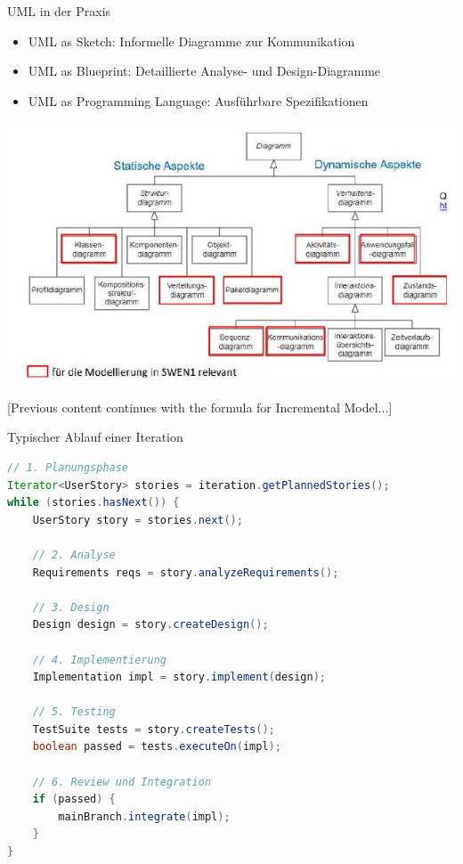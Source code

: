 \begin{concept}{UML in der Praxis}
\begin{itemize}
    \item UML as Sketch: Informelle Diagramme zur Kommunikation
    \item UML as Blueprint: Detaillierte Analyse- und Design-Diagramme
    \item UML as Programming Language: Ausführbare Spezifikationen
\end{itemize}
\includegraphics[width=\linewidth]{images/2024_12_29_0d1d7b5551ea1b4b41bdg-01(1)}
\end{concept}

[Previous content continues with the formula for Incremental Model...]

\begin{examplecode}{Typischer Ablauf einer Iteration}
\begin{lstlisting}[language=Java]
// 1. Planungsphase
Iterator<UserStory> stories = iteration.getPlannedStories();
while (stories.hasNext()) {
    UserStory story = stories.next();
    
    // 2. Analyse
    Requirements reqs = story.analyzeRequirements();
    
    // 3. Design
    Design design = story.createDesign();
    
    // 4. Implementierung
    Implementation impl = story.implement(design);
    
    // 5. Testing
    TestSuite tests = story.createTests();
    boolean passed = tests.executeOn(impl);
    
    // 6. Review und Integration
    if (passed) {
        mainBranch.integrate(impl);
    }
}
\end{lstlisting}
\end{examplecode}
